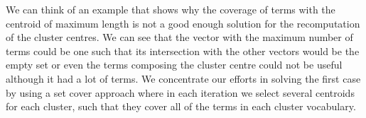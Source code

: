 \documentclass[runningheads]{llncs}
\begin{document}
We can think of an example that shows why the coverage of terms 
with the centroid of maximum length is not a good enough solution for
the recomputation of the cluster centres.
We can see that the vector with the maximum number of terms
could be one such that its intersection with the other vectors would be the empty set or even the terms composing the
cluster centre could not be useful although it had a lot of terms. We concentrate our efforts
in solving the first case by using a set cover approach where
in each iteration we select several centroids for each cluster, such that they cover all of the terms in each cluster vocabulary. 

%
%
%
%
\end{document}
